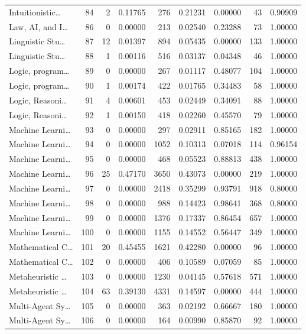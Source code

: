 \begin{table}
\begin{tabular}{lrrrrrrrr}
Intuitionistic… & 84 & 2 & 0.11765 & 276 & 0.21231 & 0.00000 & 43 & 0.90909 \\
Law, AI, and I… & 86 & 0 & 0.00000 & 213 & 0.02540 & 0.23288 & 73 & 1.00000 \\
Linguistic Stu… & 87 & 12 & 0.01397 & 894 & 0.05435 & 0.00000 & 133 & 1.00000 \\
Linguistic Stu… & 88 & 1 & 0.00116 & 516 & 0.03137 & 0.04348 & 46 & 1.00000 \\
Logic, program… & 89 & 0 & 0.00000 & 267 & 0.01117 & 0.48077 & 104 & 1.00000 \\
Logic, program… & 90 & 1 & 0.00174 & 422 & 0.01765 & 0.34483 & 58 & 1.00000 \\
Logic, Reasoni… & 91 & 4 & 0.00601 & 453 & 0.02449 & 0.34091 & 88 & 1.00000 \\
Logic, Reasoni… & 92 & 1 & 0.00150 & 418 & 0.02260 & 0.45570 & 79 & 1.00000 \\
Machine Learni… & 93 & 0 & 0.00000 & 297 & 0.02911 & 0.85165 & 182 & 1.00000 \\
Machine Learni… & 94 & 0 & 0.00000 & 1052 & 0.10313 & 0.07018 & 114 & 0.96154 \\
Machine Learni… & 95 & 0 & 0.00000 & 468 & 0.05523 & 0.88813 & 438 & 1.00000 \\
Machine Learni… & 96 & 25 & 0.47170 & 3650 & 0.43073 & 0.00000 & 219 & 1.00000 \\
Machine Learni… & 97 & 0 & 0.00000 & 2418 & 0.35299 & 0.93791 & 918 & 0.80000 \\
Machine Learni… & 98 & 0 & 0.00000 & 988 & 0.14423 & 0.98641 & 368 & 0.80000 \\
Machine Learni… & 99 & 0 & 0.00000 & 1376 & 0.17337 & 0.86454 & 657 & 1.00000 \\
Machine Learni… & 100 & 0 & 0.00000 & 1155 & 0.14552 & 0.56447 & 349 & 1.00000 \\
Mathematical C… & 101 & 20 & 0.45455 & 1621 & 0.42280 & 0.00000 & 96 & 1.00000 \\
Mathematical C… & 102 & 0 & 0.00000 & 406 & 0.10589 & 0.07059 & 85 & 1.00000 \\
Metaheuristic … & 103 & 0 & 0.00000 & 1230 & 0.04145 & 0.57618 & 571 & 1.00000 \\
Metaheuristic … & 104 & 63 & 0.39130 & 4331 & 0.14597 & 0.00000 & 444 & 1.00000 \\
Multi-Agent Sy… & 105 & 0 & 0.00000 & 363 & 0.02192 & 0.66667 & 180 & 1.00000 \\
Multi-Agent Sy… & 106 & 0 & 0.00000 & 164 & 0.00990 & 0.85870 & 92 & 1.00000 \\

\end{tabular}
\end{table}
